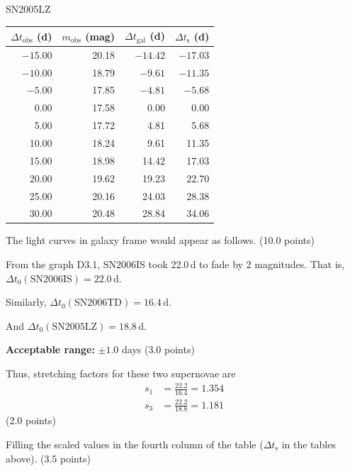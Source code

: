 \begin{description}
\begin{center}
  \medskip
  SN2005LZ

  \begin{tabular}{rrrr}
    $\Delta t_{\mathrm{obs}}$ (d) & $m_{\mathrm{obs}}$ (mag) &
    $\Delta t_{\mathrm{gal}}$ (d) & $\Delta t_{\mathrm{s}}$ (d) \\
    \hline
    $-15.00$ & 20.18 & $-14.42$ & $-17.03$ \\
    $-10.00$ & 18.79 & $-9.61$  & $-11.35$ \\
    $-5.00$  & 17.85 & $-4.81$  & $-5.68$  \\
    0.00     & 17.58 & 0.00     & 0.00     \\
    5.00     & 17.72 & 4.81     & 5.68     \\
    10.00    & 18.24 & 9.61     & 11.35    \\
    15.00    & 18.98 & 14.42    & 17.03    \\
    20.00    & 19.62 & 19.23    & 22.70    \\
    25.00    & 20.16 & 24.03    & 28.38    \\
    30.00    & 20.48 & 28.84    & 34.06    \\
  \end{tabular}
  \end{center}

  The light curves in galaxy frame would appear as follows.
  \hfill(10.0 points)

\item[(D3.2)] From the graph D3.1, SN2006IS took 22.0\,d to fade by 2
  magnitudes. That is, $\Delta t_0(\mathrm{SN2006IS}) = 22.0$\,d.

  Similarly, $\Delta t_0(\mathrm{SN2006TD}) = 16.4$\,d.

  And $\Delta t_0(\mathrm{SN2005LZ}) = 18.8$\,d.

  \textbf{Acceptable range:} $\pm 1.0$ days \hfill(3.0 points)

  Thus, stretching factors for these two supernovae are
  \begin{align*}
    s_1 &= \frac{22.2}{16.4} = 1.354 \\ %
    s_3 &= \frac{22.2}{18.8} = 1.181
  \end{align*}
  \hfill(2.0 points)

\item[(D3.3)] Filling the scaled values in the fourth column of the table
  ($\Delta t_{\mathrm{s}}$ in the tables above). \hfill(3.5 points)


\end{description}
